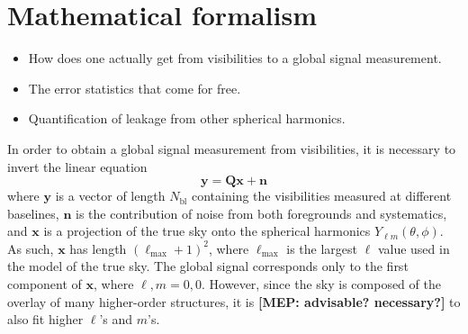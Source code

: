 \documentclass[twolcolumn,apj]{emulateapj}
\newcommand{\y}{\mathbf{y}}
\newcommand{\Q}{\mathbf{Q}}
\newcommand{\Nbl}{N_{\textrm{bl}}}
\newcommand{\acl}[1]{{\color{red} \textbf{[ACL:  #1]}}}
\newcommand{\mep}[1]{{\color{applegreen} \textbf{[MEP:  #1]}}}
\begin{document}
\section{Mathematical formalism}
\label{sec:MathForm}
\begin{itemize}
\item How does one actually get from visibilities to a global signal measurement.
\item The error statistics that come for free.
\item Quantification of leakage from other spherical harmonics.
\end{itemize}

In order to obtain a global signal measurement from visibilities, it is necessary to invert the linear equation 
\begin{equation}
\y = \Q \mathbf{x} + \mathbf{n}
\label{eqn:yQxn}
\end{equation}
where $\y$ is a vector of length $\Nbl$ containing the visibilities measured at different baselines, $\mathbf{n}$ is the contribution of noise from both foregrounds and systematics, and $\mathbf{x}$ is a projection of the true sky onto the spherical harmonics $Y_{\ell m}(\theta,\phi)$. As such, $\mathbf{x}$ has length $(\ell_{\textrm{max}}+1)^2$, where $\ell_{\textrm{max}}$ is the largest $\ell$ value used in the model of the true sky. The global signal corresponds only to the first component of $\mathbf{x}$, where $\ell,m=0,0$. However, since the sky is composed of the overlay of many higher-order structures, it is \mep{advisable? necessary?} to also fit higher $\ell$'s and $m$'s. 
\end{document}

